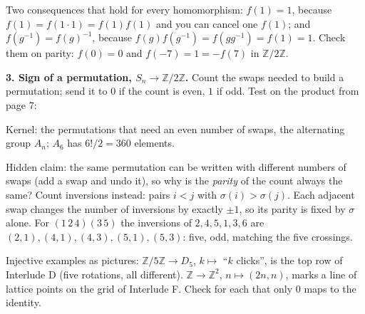 \documentclass[10pt]{article}
\newcommand{\Z}{\mathbb{Z}}
\begin{document}
{\begin{minipage}[t]{744pt}
\begin{minipage}[t]{350pt}
\begin{why}
Two consequences that hold for every homomorphism: $f(1)=1$, because $f(1)=f(1\cdot1)=f(1)f(1)$ and you can cancel one $f(1)$; and $f(g^{-1})=f(g)^{-1}$, because $f(g)f(g^{-1})=f(gg^{-1})=f(1)=1$. Check them on parity: $f(0)=0$ and $f(-7)=1=-f(7)$ in $\Z/2\Z$.
\end{why}
\end{minipage}\hfill
\begin{minipage}[t]{370pt}\vspace{0pt}
{\sffamily\bfseries 3. Sign of a permutation, $S_n\to\Z/2\Z$.} Count the swaps needed to build a permutation; send it to $0$ if the count is even, $1$ if odd. Test on the product from page 7:\par\vspace{4pt}
\par\vspace{4pt}
\raggedright
Kernel: the permutations that need an even number of swaps, the alternating group $A_n$; $A_6$ has $6!/2=360$ elements.
\begin{pitfall}
Hidden claim: the same permutation can be written with different numbers of swaps (add a swap and undo it), so why is the \emph{parity} of the count always the same? Count inversions instead: pairs $i<j$ with $\sigma(i)>\sigma(j)$. Each adjacent swap changes the number of inversions by exactly $\pm1$, so its parity is fixed by $\sigma$ alone. For $(1\,2\,4)(3\,5)$ the inversions of $2,4,5,1,3,6$ are $(2,1),(4,1),(4,3),(5,1),(5,3)$: five, odd, matching the five crossings.
\end{pitfall}
\begin{tryit}
Injective examples as pictures: $\Z/5\Z\to D_5$, $k\mapsto$ ``$k$ clicks'', is the top row of Interlude D (five rotations, all different). $\Z\to\Z^2$, $n\mapsto(2n,n)$, marks a line of lattice points on the grid of Interlude F. Check for each that only $0$ maps to the identity.
\end{tryit}
\end{minipage}
\end{minipage}
}
\end{document}
